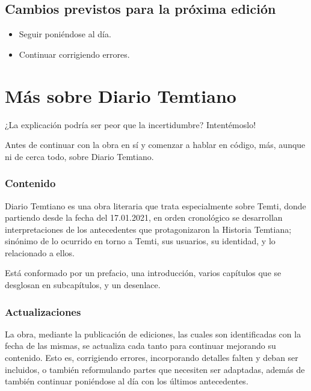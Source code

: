 \documentclass[
  spanish,
]{book}
\begin{document}
\hypertarget{cambios-previstos-para-la-pruxf3xima-ediciuxf3n}{%
\section*{Cambios previstos para la próxima edición}\label{cambios-previstos-para-la-pruxf3xima-ediciuxf3n}}

\begin{itemize}
\item
  Seguir poniéndose al día.
\item
  Continuar corrigiendo errores.
\end{itemize}

\hypertarget{muxe1s-sobre-diario-temtiano}{%
\chapter*{Más sobre Diario Temtiano}\label{muxe1s-sobre-diario-temtiano}}

¿La explicación podría ser peor que la incertidumbre? Intentémoslo!

Antes de continuar con la obra en sí y comenzar a hablar en código, más, aunque ni de cerca todo, sobre Diario Temtiano.

\hypertarget{contenido}{%
\subsection*{Contenido}\label{contenido}}

Diario Temtiano es una obra literaria que trata especialmente sobre Temti, donde partiendo desde la fecha del 17.01.2021, en orden cronológico se desarrollan interpretaciones de los antecedentes que protagonizaron la Historia Temtiana; sinónimo de lo ocurrido en torno a Temti, sus usuarios, su identidad, y lo relacionado a ellos.

Está conformado por un prefacio, una introducción, varios capítulos que se desglosan en subcapítulos, y un desenlace.

\hypertarget{actualizaciones}{%
\subsection*{Actualizaciones}\label{actualizaciones}}

La obra, mediante la publicación de ediciones, las cuales son identificadas con la fecha de las mismas, se actualiza cada tanto para continuar mejorando su contenido. Esto es, corrigiendo errores, incorporando detalles falten y deban ser incluidos, o también reformulando partes que necesiten ser adaptadas, además de también continuar poniéndose al día con los últimos antecedentes.
\end{document}
